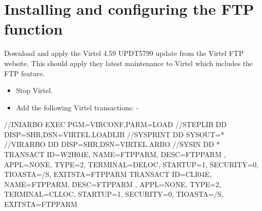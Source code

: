 \documentclass[letterpaper,10pt,english]{sphinxmanual}
\begin{document}
\section{Installing and configuring the FTP function}
\label{\detokenize{Customization:installing-and-configuring-the-ftp-function}}
Download and apply the Virtel 4.59 UPDT5799 update from the Virtel FTP website. This should apply they latest maintenance to Virtel which includes the FTP feature.
\begin{itemize}
\item {} 
Stop Virtel.

\item {} 
Add the following Virtel transactions: -

\end{itemize}

\begin{sphinxVerbatim}[commandchars=\\\{\}]
//INIARBO EXEC PGM=VIRCONF,PARM=LOAD
//STEPLIB  DD  DISP=SHR,DSN=VIRTEL.LOADLIB
//SYSPRINT DD  SYSOUT=*
//VIRARBO  DD  DISP=SHR,DSN=VIRTEL.ARBO
//SYSIN    DD  *
    TRANSACT ID=W2H\PYGZhy{}04E,                                             \PYGZhy{}
            NAME=FTPPARM,                                           \PYGZhy{}
            DESC=\PYGZsq{}FTPPARM   \PYGZsq{},                                      \PYGZhy{}
            APPL=\PYGZdl{}NONE\PYGZdl{},                                            \PYGZhy{}
            TYPE=2,                                                 \PYGZhy{}
            TERMINAL=DELOC,                                         \PYGZhy{}
            STARTUP=1,                                              \PYGZhy{}
            SECURITY=0,                                             \PYGZhy{}
            TIOASTA=\PYGZam{}/S,                                            \PYGZhy{}
            EXITSTA=FTPPARM
    TRANSACT ID=CLI\PYGZhy{}04E,                                             \PYGZhy{}
            NAME=FTPPARM,                                           \PYGZhy{}
            DESC=\PYGZsq{}FTPPARM   \PYGZsq{},                                      \PYGZhy{}
            APPL=\PYGZdl{}NONE\PYGZdl{},                                            \PYGZhy{}
            TYPE=2,                                                 \PYGZhy{}
            TERMINAL=CLLOC,                                         \PYGZhy{}
            STARTUP=1,                                              \PYGZhy{}
            SECURITY=0,                                             \PYGZhy{}
            TIOASTA=\PYGZam{}/S,                                            \PYGZhy{}
            EXITSTA=FTPPARM
\end{sphinxVerbatim}
\end{document}
